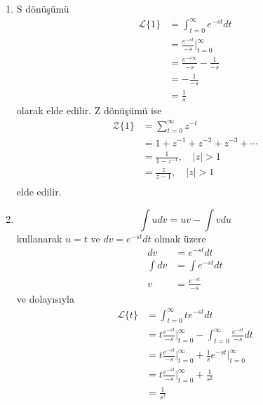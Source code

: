 \begin{enumerate}
\item S dönüşümü
\begin{equation}
    \begin{split}
        \mathcal{L}\{1\}&=\int_{t=0}^{\infty}e^{-st}dt\\
        &=\frac{e^{-st}}{-s}\Bigg|_{t=0}^{\infty}\\
        &=\frac{e^{-s\infty}}{-s}-\frac{1}{-s}\\
        &=-\frac{1}{-s}\\
        &=\frac{1}{s}
    \end{split}
\end{equation}
olarak elde edilir. Z dönüşümü ise
\begin{equation}
    \begin{split}
        \mathcal{Z}\{1\}&=\sum_{t=0}^{\infty}z^{-t}\\
        &=1+z^{-1}+z^{-2}+z^{-3}+\cdots\\
        &=\frac{1}{1-z^{-1}},\quad |z|>1\\
        &=\frac{z}{z-1},\quad |z|>1\\
    \end{split}
\end{equation}
elde edilir.
\item \begin{equation}
    \int udv=uv-\int vdu
\end{equation}
kullanarak $u=t$ ve $dv=e^{-st}dt$ olmak üzere
\begin{equation}
    \begin{split}
        dv&=e^{-st}dt\\
        \int dv&=\int e^{-st}dt\\
        v&=\frac{e^{-st}}{-s}
    \end{split}
\end{equation}
ve dolayısıyla
\begin{equation}
    \begin{split}
        \mathcal{L}\{t\}&=\int_{t=0}^{\infty}t e^{-st}dt\\
        &=t\frac{e^{-st}}{-s}\Bigg|_{t=0}^{\infty}-\int_{t=0}^{\infty}\frac{e^{-st}}{-s}dt\\
        &=t\frac{e^{-st}}{-s}\Bigg|_{t=0}^{\infty}+\frac{1}{s}e^{-st}\Bigg|_{t=0}^{\infty}\\
        &=t\frac{e^{-st}}{-s}\Bigg|_{t=0}^{\infty}+\frac{1}{s^2}\\
        &=\frac{1}{s^2}
    \end{split}

\end{equation}
\end{enumerate}
